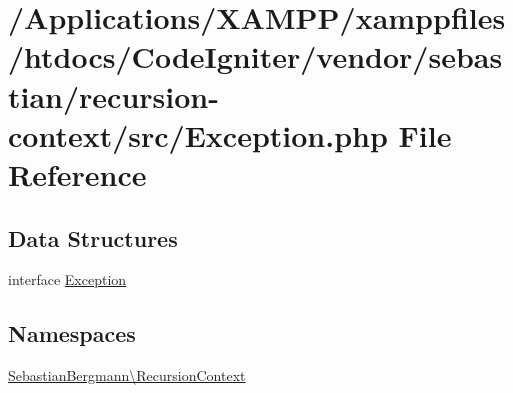 \hypertarget{sebastian_2recursion-context_2src_2_exception_8php}{}\section{/\+Applications/\+X\+A\+M\+P\+P/xamppfiles/htdocs/\+Code\+Igniter/vendor/sebastian/recursion-\/context/src/\+Exception.php File Reference}
\label{sebastian_2recursion-context_2src_2_exception_8php}
\subsection*{Data Structures}
\begin{DoxyCompactItemize}
\item 
interface \mbox{\hyperlink{interface_sebastian_bergmann_1_1_recursion_context_1_1_exception}{Exception}}
\end{DoxyCompactItemize}
\subsection*{Namespaces}
\begin{DoxyCompactItemize}
\item 
 \mbox{\hyperlink{namespace_sebastian_bergmann_1_1_recursion_context}{Sebastian\+Bergmann\textbackslash{}\+Recursion\+Context}}
\end{DoxyCompactItemize}
